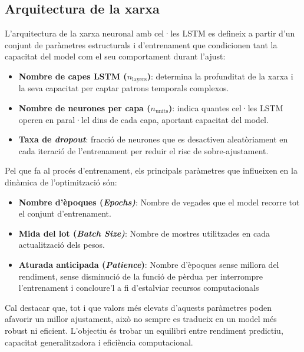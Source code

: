 \documentclass[../main.tex]{subfiles}
\begin{document}
\subsection{Arquitectura de la xarxa}

L’arquitectura de la xarxa neuronal amb cel·les LSTM es defineix a partir d’un conjunt de paràmetres estructurals i d’entrenament que condicionen tant la capacitat del model com el seu comportament durant l’ajust:

\begin{itemize}
    \item \textbf{Nombre de capes LSTM ($n_{\text{layers}}$)}: determina la profunditat de la xarxa i la seva capacitat per captar patrons temporals complexos.

    \item \textbf{Nombre de neurones per capa ($n_{\text{units}}$)}: indica quantes cel·les LSTM operen en paral·lel dins de cada capa, aportant capacitat del model.

    \item \textbf{Taxa de \textit{dropout}}: fracció de neurones que es desactiven aleatòriament en cada iteració de l'entrenament per reduir el risc de sobre-ajustament.
\end{itemize}


Pel que fa al procés d’entrenament, els principals paràmetres que influeixen en la dinàmica de l’optimització són:

\begin{itemize}
    \item \textbf{Nombre d’èpoques (\textit{Epochs)}}: Nombre de vegades que el model recorre tot el conjunt d’entrenament.

    \item \textbf{Mida del lot (\textit{Batch Size)}}: Nombre de mostres utilitzades en cada actualització dels pesos.

    \item \textbf{Aturada anticipada (\textit{Patience})}:  Nombre d'èpoques sense millora del rendiment, sense disminució de la funció de pèrdua per interrompre l'entrenament i concloure'l a fi d'estalviar recursos computacionals

\end{itemize}

Cal destacar que, tot i que valors més elevats d’aquests paràmetres poden afavorir un millor ajustament, això no sempre es tradueix en un model més robust ni eficient. L’objectiu és trobar un equilibri entre rendiment predictiu, capacitat generalitzadora i eficiència computacional.
\end{document}
